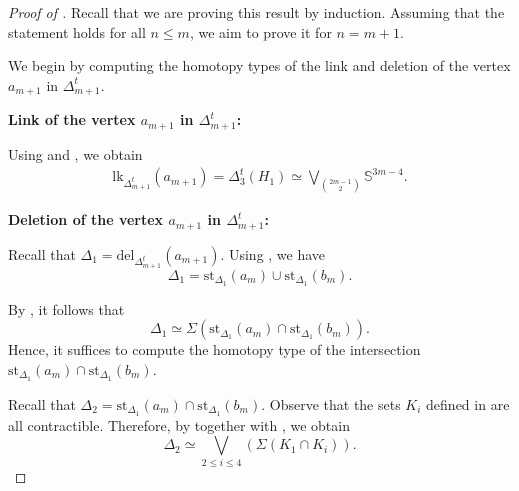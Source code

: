\documentclass[11pt,reqno,a4paper]{amsart}
\theoremstyle{definition}
\theoremstyle{theorem}
\newcommand{\totalthreecut}{\Delta_{3}^t}
\newcommand{\lno}{\left(}
\newcommand{\rno}{\right)}
\newcommand{\bbS}{\mathbb{S}}
\newcommand{\lk}{\mathrm{lk}}
\newcommand{\del}{\mathrm{del}}
\newcommand{\st}{\mathrm{st}}
\theoremstyle{remark}
\begin{document}
\begin{proof}[Proof of ]
Recall that we are proving this result by induction. Assuming that the statement holds for all $n \leq m$, we aim to prove it for $n = m+1$.

We begin by computing the homotopy types of the link and deletion of the vertex $a_{m+1}$ in $\Delta_{m+1}^t$.

\medskip
\noindent\textbf{Link of the vertex $a_{m+1}$ in $\Delta_{m+1}^t$:}

Using  and , we obtain
\begin{align}\label{link of a_(m+1)}
    \lk_{\Delta_{m+1}^t}\lno a_{m+1} \rno
    = \totalthreecut \lno H_1 \rno
    \simeq \bigvee\limits_{\binom{2m-1}{2}} \bbS^{3m-4}.
\end{align}

\noindent\textbf{Deletion of the vertex $a_{m+1}$ in $\Delta_{m+1}^t$:}

Recall that $\Delta_1 = \del_{\Delta_{m+1}^t}\lno a_{m+1} \rno$. Using , we have
\[
    \Delta_1 = \st_{\Delta_1}\lno a_m \rno \cup \st_{\Delta_1}\lno b_m \rno.
\]

By , it follows that
\[
    \Delta_1 \simeq \Sigma \lno \st_{\Delta_1}\lno a_m \rno \cap \st_{\Delta_1}\lno b_m \rno \rno.
\]
Hence, it suffices to compute the homotopy type of the intersection $\st_{\Delta_1}\lno a_m \rno \cap \st_{\Delta_1}\lno b_m \rno$.

Recall that $\Delta_2 = \st_{\Delta_1}\lno a_m \rno \cap \st_{\Delta_1}\lno b_m \rno$. Observe that the sets $K_i$ defined in  are all contractible. Therefore, by  together with , we obtain
\[
    \Delta_2 \simeq 
    \bigvee\limits_{2 \leq i \leq 4}
    \lno \Sigma \lno K_1 \cap K_i \rno \rno.
\]


\end{proof}
\end{document}
